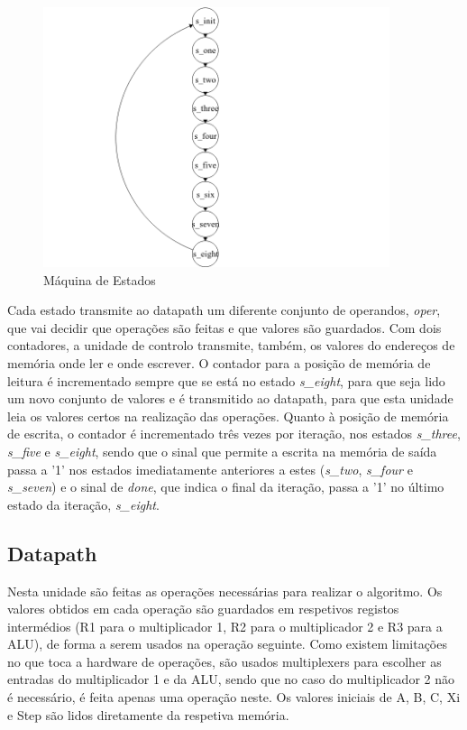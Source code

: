 \documentclass{article} %
\begin{document}
		\begin{figure}[htbp]
			\begin{center}
				\includegraphics[width = 4in]{FSM.png}
				\caption{Máquina de Estados}
				\label{fig:FSM}
			\end{center}
		\end{figure}

			\noindent Cada estado transmite ao datapath um diferente conjunto de operandos, \emph{oper}, que vai decidir que operações são feitas e que valores são guardados. Com dois contadores, a unidade de controlo transmite, também, os valores do endereços de memória onde ler e onde escrever. O contador para a posição de memória de leitura é incrementado sempre que se está no estado \emph{s\_eight}, para que seja lido um novo conjunto de valores e é transmitido ao datapath, para que esta unidade leia os valores certos na realização das operações. Quanto à posição de memória de escrita, o contador é incrementado três vezes por iteração, nos estados \emph{s\_three}, \emph{s\_five} e \emph{s\_eight}, sendo que o sinal que permite a escrita na memória de saída passa a '1' nos estados imediatamente anteriores a estes (\emph{s\_two}, \emph{s\_four} e \emph{s\_seven}) e o sinal de \emph{done}, que indica o final da iteração, passa a '1' no último estado da iteração, \emph{s\_eight}.  


		\subsection{Datapath}
			Nesta unidade são feitas as operações necessárias para realizar o algoritmo. Os valores obtidos em cada operação são guardados em respetivos registos intermédios (R1 para o multiplicador 1, R2 para o multiplicador 2 e R3 para a ALU), de forma a serem usados na operação seguinte. Como existem limitações no que toca a hardware de operações, são usados multiplexers para escolher as entradas do multiplicador 1 e da ALU, sendo que no caso do multiplicador 2 não é necessário, é feita apenas uma operação neste. Os valores iniciais de A, B, C, Xi e Step são lidos diretamente da respetiva memória.\\
\end{document}
